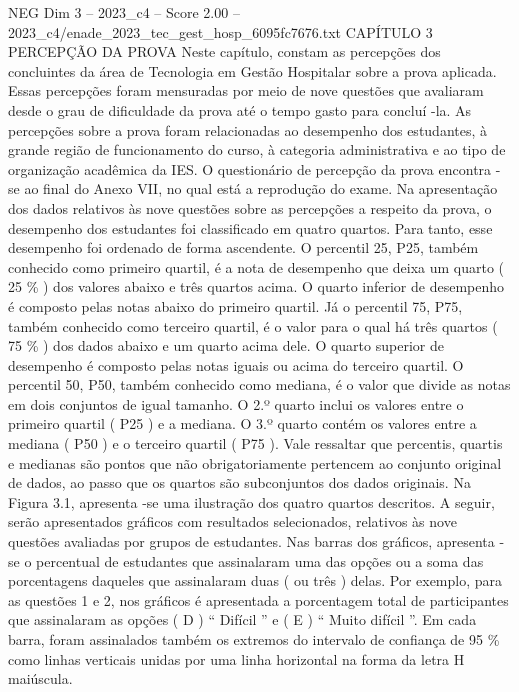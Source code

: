 \begin{textsample}{NEG Dim 3 – 2023\_c4 – Score 2.00 – 2023\_c4/enade\_2023\_tec\_gest\_hosp\_6095fc7676.txt}  \label{ex:f3_neg_214}
CAPÍTULO 3 PERCEPÇÃO DA PROVA Neste capítulo, constam as percepções dos concluintes da área de Tecnologia em Gestão Hospitalar sobre a prova aplicada.
Essas percepções foram mensuradas por meio de nove questões que avaliaram desde o grau de dificuldade da prova até o tempo gasto para concluí -la.
As percepções sobre a prova foram relacionadas ao desempenho dos estudantes, à grande região de funcionamento do curso, à categoria administrativa e ao tipo de organização acadêmica da IES.
O questionário de percepção da prova encontra -se ao final do Anexo VII, no qual está a reprodução do exame.
Na apresentação dos dados relativos às nove questões sobre as percepções a respeito da prova, o desempenho dos estudantes foi classificado em quatro quartos.
Para tanto, esse desempenho foi ordenado de forma ascendente.
O percentil 25, P25, também conhecido como primeiro quartil, é a nota de desempenho que deixa um quarto ( 25 \% ) dos valores abaixo e três quartos acima.
O quarto inferior de desempenho é composto pelas notas abaixo do primeiro quartil.
Já o percentil 75, P75, também conhecido como terceiro quartil, é o valor para o qual há três quartos ( 75 \% ) dos dados abaixo e um quarto acima dele.
O quarto superior de desempenho é composto pelas notas iguais ou acima do terceiro quartil.
O percentil 50, P50, também conhecido como mediana, é o valor que divide as notas em dois conjuntos de igual tamanho.
O 2.º quarto inclui os valores entre o primeiro quartil ( P25 ) e a mediana.
O 3.º quarto contém os valores entre a mediana ( P50 ) e o terceiro quartil ( P75 ).
Vale ressaltar que percentis, quartis e medianas são pontos que não obrigatoriamente pertencem ao conjunto original de dados, ao passo que os quartos são subconjuntos dos dados originais.
Na Figura 3.1, apresenta -se uma ilustração dos quatro quartos descritos.
A seguir, serão apresentados gráficos com resultados selecionados, relativos às nove questões avaliadas por grupos de estudantes.
Nas barras dos gráficos, apresenta -se o percentual de estudantes que assinalaram uma das opções ou a soma das porcentagens daqueles que assinalaram duas ( ou três ) delas.
Por exemplo, para as questões 1 e 2, nos gráficos é apresentada a porcentagem total de participantes que assinalaram as opções ( D ) “ Difícil ” e ( E ) “ Muito difícil ”.
Em cada barra, foram assinalados também os extremos do intervalo de confiança de 95 \% como linhas verticais unidas por uma linha horizontal na forma da letra H maiúscula.

\end{textsample}
